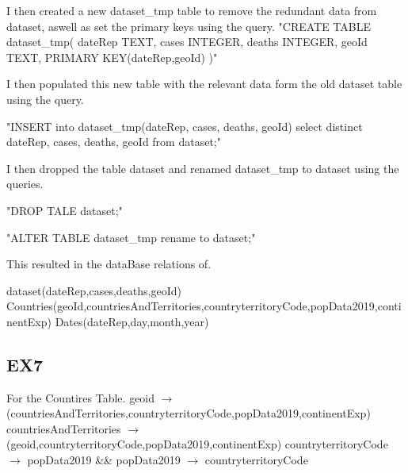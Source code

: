 \documentclass{report}
\begin{document}
	I then created a new dataset\_tmp table to remove the redundant data from dataset, aswell as set the primary keys using the query.\newline\newline
	"CREATE TABLE dataset\_tmp(
	dateRep TEXT,
	cases INTEGER,
	deaths INTEGER,
	geoId TEXT,
	PRIMARY KEY(dateRep,geoId)
	)"\newline
	
	I then populated this new table with the relevant data form the old dataset table using the query.\newline
	
	"INSERT into dataset\_tmp(dateRep, cases, deaths, geoId) select distinct dateRep, cases, deaths, geoId from dataset;"\newline
	
	I then dropped the table dataset and renamed dataset\_tmp to dataset using the queries.\newline
	
	"DROP TALE dataset;"\newline
	
	"ALTER TABLE dataset\_tmp rename to dataset;"\newline
	
	This resulted in the dataBase relations of.\newline
	
	dataset(dateRep,cases,deaths,geoId)\newline
	Countries(geoId,countriesAndTerritories,countryterritoryCode,popData2019,continentExp)\newline
	Dates(dateRep,day,month,year)\newline
	
	
	
	
	\subsection{EX7}
	For the Countires Table. \newline
	\newline
	geoid $\rightarrow$ (countriesAndTerritories,countryterritoryCode,popData2019,continentExp)\newline
	countriesAndTerritories $\rightarrow$ (geoid,countryterritoryCode,popData2019,continentExp)\newline
	countryterritoryCode $\rightarrow$ popData2019 \&\&\newline 
	popData2019 $\rightarrow$ countryterritoryCode\newline
	
\end{document}
